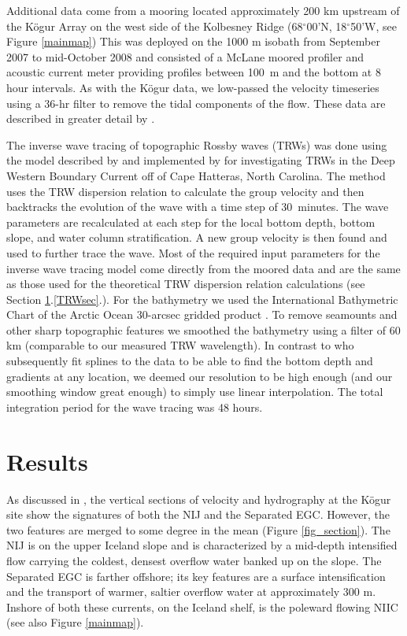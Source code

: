 \documentclass[12pt,titlepage,figuresatend]{article}
\begin{document}
Additional data come from a mooring located approximately 200 km upstream of the K\"{o}gur Array on the west side of the Kolbesney Ridge (68$^{\circ}$00'N, 18$^{\circ}$50'W, see Figure \ref{mainmap}) This was deployed on the 1000 m isobath from September 2007 to mid-October 2008 and consisted of a McLane moored profiler and acoustic current meter providing profiles between 100~m and the bottom at 8 hour intervals. As with the K\"{o}gur data, we low-passed the velocity timeseries using a 36-hr filter to remove the tidal components of the flow. These data are described in greater detail by \cite{Jonsson2012}.

The inverse wave tracing of topographic Rossby waves (TRWs) was done using the model described by \cite{Meinen1993} and implemented by \cite{Pickart1995} for investigating TRWs in the Deep Western Boundary Current off of Cape Hatteras, North Carolina. The method uses the TRW dispersion relation to calculate the group velocity and then backtracks the evolution of the wave with a time step of 30~minutes. The wave parameters are recalculated at each step for the local bottom depth, bottom slope, and water column stratification. A new group velocity is then found and used to further trace the wave. Most of the required input parameters for the inverse wave tracing model come directly from the moored data and are the same as those used for the theoretical TRW dispersion relation calculations (see Section \ref{results}.\ref{TRWsec}.). For the bathymetry we used the International Bathymetric Chart of the Arctic Ocean 30-arcsec gridded product \cite[]{Jakobsson2012}. To remove seamounts and other sharp topographic features we smoothed the bathymetry using a filter of 60 km (comparable to our measured TRW wavelength). In contrast to \cite{Pickart1995} who subsequently fit splines to the data to be able to find the bottom depth and gradients at any location, we deemed our resolution to be high enough (and our smoothing window great enough) to simply use linear interpolation. The total integration period for the wave tracing was 48 hours.


\section{Results}
\label{results}

As discussed in \cite{Harden2016}, the vertical sections of velocity and hydrography at the K\"{o}gur site show the signatures of both the NIJ and the Separated EGC. However, the two features are merged to some degree in the mean (Figure \ref{fig_section}). The NIJ is on the upper Iceland slope and is characterized by a mid-depth intensified flow carrying the coldest, densest overflow water banked up on the slope. The Separated EGC is farther offshore; its key features are a surface intensification and the transport of warmer, saltier overflow water at approximately 300 m. Inshore of both these currents, on the Iceland shelf, is the poleward flowing NIIC (see also Figure \ref{mainmap}).
\end{document}
